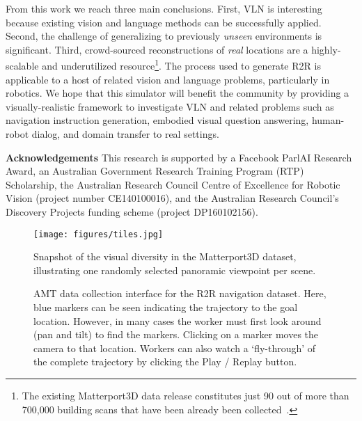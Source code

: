 \documentclass[10pt,twocolumn,letterpaper]{article}
\begin{document}
From this work we reach three main conclusions. First, VLN is interesting because existing vision and language methods can be successfully applied. Second, the challenge of generalizing to previously \textit{unseen} environments is significant. Third, crowd-sourced reconstructions of \textit{real} locations are a highly-scalable and underutilized resource\footnote{The existing Matterport3D data release constitutes just 90 out of more than 700,000 building scans that have been already been collected~\cite{Matt}.}. The process used to generate R2R is applicable to a host of related vision and language problems, particularly in robotics. We hope that this simulator will benefit the community by providing a visually-realistic framework to investigate VLN and related problems such as navigation instruction generation, embodied visual question answering, human-robot dialog, and domain transfer to real settings.

{
\small
\textbf{Acknowledgements} This research is supported by a Facebook ParlAI Research Award, an Australian Government Research Training Program (RTP) Scholarship, the Australian Research Council Centre of Excellence for Robotic Vision (project number CE140100016), and the Australian Research Council's Discovery Projects funding scheme (project DP160102156).
}

{\small


}

\newpage






\begin{figure*}[h]
	\begin{center}
		\texttt{[image: figures/tiles.jpg]}
	\end{center}
	\caption{Snapshot of the visual diversity in the Matterport3D dataset, illustrating one randomly selected panoramic viewpoint per scene. }
	\label{fig:tiles}
\end{figure*}


\begin{figure*}
	\begin{center}
	\end{center}
	\caption{AMT data collection interface for the R2R navigation dataset. Here, blue markers can be seen indicating the trajectory to the goal location. However, in many cases the worker must first look around (pan and tilt) to find the markers. Clicking on a marker moves the camera to that location. Workers can also watch a `fly-through' of the complete trajectory by clicking the Play / Replay button. }
	\label{fig:interface}
\end{figure*}
\end{document}
